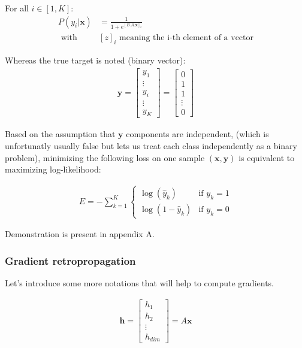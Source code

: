For all $i \in [1, K]$: 
\begin{align}
	P(y_i | \mathbf{x}) &= \frac{1}{1 + e^{[B.A.\mathbf{x}]_i}}\\
		\text{      with } &[z]_i \text{ meaning the i-th element of a vector}
\end{align}

Whereas the true target is noted (binary vector):
\begin{align}
 \mathbf{y} = 
	\begin{bmatrix} 
		y_1 \\
		\vdots \\
		y_i \\
		\vdots \\
		y_K
	\end{bmatrix}
	= 
	\begin{bmatrix} 
		0 \\
		1 \\
		1 \\
		\vdots \\
		0
	\end{bmatrix}  
\end{align}

Based on the assumption that $\mathbf{y}$ components are independent, (which is unfortunatly usually false but lets us treat each class independently as a binary problem), minimizing the following loss on one sample $(\mathbf{x}, \mathbf{y})$ is equivalent to maximizing log-likelihood:

\begin{align}
	E = - \sum_{k=1}^K
  			  	\left\{
				    \begin{array}{ll}
				        \log (\hat y_k) & \mbox{if } y_k =1 \\
				        \log (1 - \hat y_k) & \mbox{if } y_k =0
				    \end{array}
				\right.
\end{align}

Demonstration is present in appendix A.


\subsubsection{Gradient retropropagation}

Let's introduce some more notations that will help to compute gradients.

\begin{align}
	\mathbf{h}
	= \begin{bmatrix} 
		h_1 \\
		h_2 \\
		\vdots \\
		h_{\textit{dim}}
	\end{bmatrix}
	= A\mathbf{x}
\end{align}

